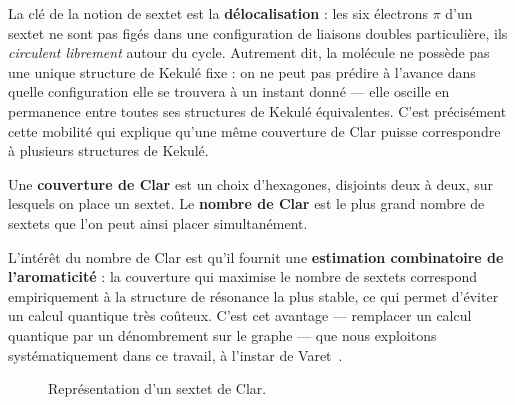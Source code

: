 \documentclass[11pt,a4paper]{article}
\begin{document}
La clé de la notion de sextet est la \textbf{délocalisation} : les six
électrons $\pi$ d'un sextet ne sont pas figés dans une configuration de
liaisons doubles particulière, ils \emph{circulent librement} autour du
cycle. Autrement dit, la molécule ne possède pas une unique structure de
Kekulé fixe : on ne peut pas prédire à l'avance dans quelle configuration
elle se trouvera à un instant donné --- elle oscille en permanence entre
toutes ses structures de Kekulé équivalentes. C'est précisément cette
mobilité qui explique qu'une même couverture de Clar puisse correspondre
à plusieurs structures de Kekulé.

Une \textbf{couverture de Clar} est un choix d'hexagones, disjoints
deux à deux, sur lesquels on place un sextet. Le \textbf{nombre de
Clar} est le plus grand nombre de sextets que l'on peut ainsi placer
simultanément.

L'intérêt du nombre de Clar est qu'il fournit une \textbf{estimation
combinatoire de l'aromaticité} : la couverture qui maximise le nombre de
sextets correspond empiriquement à la structure de résonance la plus
stable, ce qui permet d'éviter un calcul quantique
très coûteux. C'est cet avantage --- remplacer un calcul
quantique par un dénombrement sur le graphe --- que nous exploitons
systématiquement dans ce travail, à l'instar de Varet~\cite{varet2022}.

\begin{figure}[h]
\centering
{}
\caption{Représentation d'un sextet de Clar.}
\label{fig:sextet}
\end{figure}
\end{document}
